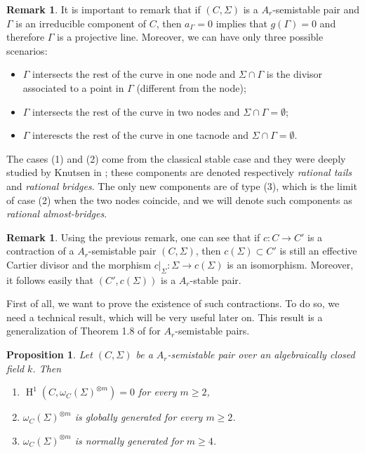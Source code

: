\documentclass{alggeom}
\numberwithin{equation}{section}
\numberwithin{subsection}{section}
\newtheorem{proposition}[theorem]{Proposition}
\theoremstyle{definition}
\newtheorem{remark}[theorem]{Remark}
\theoremstyle{remark}
\renewcommand\H{\operatorname{H}}
\begin{document}
\begin{remark} \label{rem:poss-contrac}
 It is important to remark that if $(C,\Sigma)$ is a $A_r$-semistable pair and $\Gamma$ is an irreducible component of $C$, then $a_{\Gamma}=0$ implies that $g(\Gamma)=0$ and therefore $\Gamma$ is a projective line. Moreover, we can have only three possible scenarios: 
 \begin{itemize}
  \item[(1)] $\Gamma$ intersects the rest of the curve in one node and $\Sigma\cap \Gamma$ is the divisor associated to a point in $\Gamma$ (different from the node);
  \item[(2)] $\Gamma$ intersects the rest of the curve in two nodes and $\Sigma\cap \Gamma = \emptyset$;
  \item[(3)] $\Gamma$ interescts the rest of the curve in one tacnode and $\Sigma\cap \Gamma = \emptyset$.
 \end{itemize}
The cases (1) and (2) come from the classical stable case and they were deeply studied by Knutsen in \cite{Knu}; these components are denoted respectively \emph{rational tails} and \emph{rational bridges}.  The only new components are of type (3), which is the limit of case (2) when the two nodes coincide, and we will denote such components as \emph{rational almost-bridges}. 
\end{remark}

\begin{remark}\label{rem:cart-div}
 Using the previous remark, one can see that if $c:C\rightarrow C'$ is a contraction of a $A_r$-semistable pair $(C,\Sigma)$, then $c(\Sigma)\subset C'$ is still an effective Cartier divisor and the morphism $c\vert_{\Sigma}: \Sigma \rightarrow c(\Sigma)$ is an isomorphism. Moreover, it follows easily that $(C',c(\Sigma))$ is a $A_r$-stable pair.
\end{remark}

First of all, we want to prove the existence of such contractions. To do so, we need a technical result, which will be very useful later on. This result is a generalization of Theorem 1.8 of \cite{Knu} for $A_r$-semistable pairs.

\begin{proposition}\label{prop:boundedness}
	Let $(C,\Sigma)$ be a $A_r$-semistable pair over an algebraically closed field $k$. Then 
	\begin{enumerate}
		\item[i)] $\H^1(C,\omega_C(\Sigma)^{\otimes m})=0$ for every $m\geq 2$,
		\item[ii)] $\omega_C(\Sigma)^{\otimes m}$ is globally generated for every $m\geq 2$.
		\item[iii)] $\omega_C(\Sigma)^{\otimes m}$ is normally generated for $m\geq 4$.
	\end{enumerate}
\end{proposition}
\end{document}

